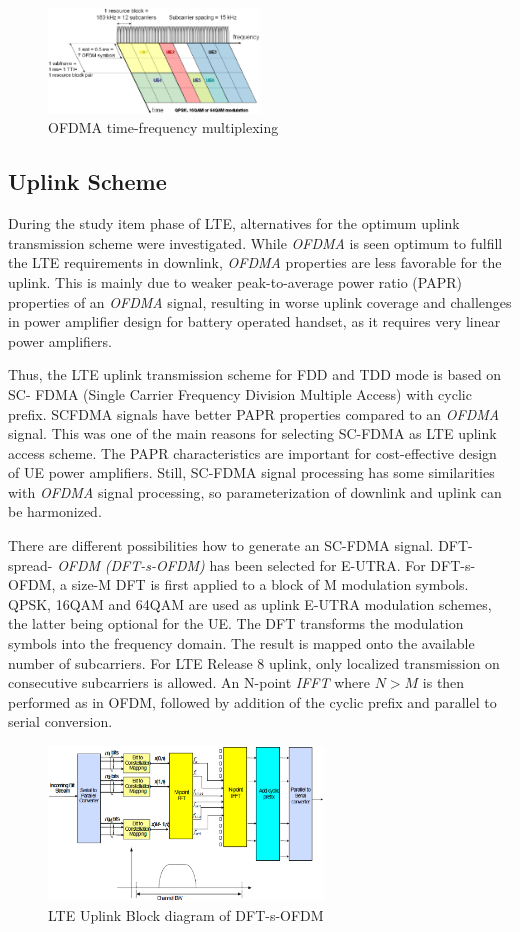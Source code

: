 \begin{figure}[htbp]
    \centering
    \includegraphics[width=0.50\textwidth]{./figures/downlink_channels}
    \caption{ OFDMA time-frequency multiplexing
    \label{fig:dlchann}}
\end{figure}


\subsection{Uplink Scheme}%

 During the study item phase of LTE, alternatives for the optimum uplink
transmission scheme were investigated. While \textit{OFDMA} is seen optimum to fulfill
the LTE requirements in downlink, \textit{OFDMA} properties are less favorable for the
uplink. This is mainly due to weaker peak-to-average power ratio (PAPR)
properties of an \textit{OFDMA} signal, resulting in worse uplink coverage and
challenges in power amplifier design for battery operated handset, as it
requires very linear power amplifiers.

Thus, the LTE uplink transmission scheme for FDD and TDD mode is based on SC-
FDMA (Single Carrier Frequency Division Multiple Access) with cyclic prefix.
SCFDMA signals have better PAPR properties compared to an \textit{OFDMA} signal. This was
one of the main reasons for selecting SC-FDMA as LTE uplink access scheme. The
PAPR characteristics are important for cost-effective design of UE power
amplifiers. Still, SC-FDMA signal processing has some similarities with \textit{OFDMA}
signal processing, so parameterization of downlink and uplink can be
harmonized.

There are different possibilities how to generate an SC-FDMA signal. DFT-spread-
\textit{OFDM} \textit{(DFT-s-OFDM)} has been selected for E-UTRA. For DFT-s-OFDM, a size-M DFT is
first applied to a block of M modulation symbols. QPSK, 16QAM and 64QAM are used
as uplink E-UTRA modulation schemes, the latter being optional for the UE. The
DFT transforms the modulation symbols into the frequency domain. The result is
mapped onto the available number of subcarriers. For LTE Release 8 uplink, only
localized transmission on consecutive subcarriers is allowed. An N-point \textit{IFFT}
where $N>M$ is then performed as in OFDM, followed by addition of the cyclic
prefix and parallel to serial conversion.

\begin{figure}[htbp]
    \centering
    \includegraphics[width=0.65\textwidth]{./figures/uplink_scheme}
    \caption{ LTE Uplink Block diagram of DFT-s-OFDM
    \label{fig:uplinkbd}}
\end{figure}
